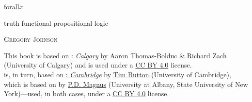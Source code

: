 

\pagestyle{empty}

\vspace*{80pt}

\begin{raggedleft}
\fontsize{34pt}{24pt}\sffamily
\selectfont
{forall\hspace{.08em}\fontsize{36pt}{24pt}\selectfont\rmfamily\textit{x}}

\smallskip\fontsize{16pt}{20pt}\sffamily\selectfont
\textcolor{maroon}{\uppercase{}}  

\bigskip\fontsize{16pt}{20pt}\selectfont

truth functional propositional logic

\vspace*{50pt}
\fontsize{10pt}{16pt}\selectfont
\textsc{Gregory Johnson}

\vfill
\textcolor{maroon}{\forallxversion}\par
\end{raggedleft}


\newpage 


\noindent \small This book is based on \href{http://forallx.openlogicproject.org/}{\forallx:\emph{ Calgary}} by {Aaron Thomas-Bolduc \& Richard Zach} ({University of Calgary}) and is used under a \href{https://creativecommons.org/licenses/by/4.0/}{CC BY 4.0} license.\\[1ex] 

 is, in turn, based on \href{http://people.ds.cam.ac.uk/tecb2/forallx.shtml}{\forallx:\emph{ Cambridge}} by \href{http://people.ds.cam.ac.uk/tecb2/index.shtml}{Tim Button} ({University of Cambridge}), 
which is based on \href{https://www.fecundity.com/logic/}{\forallx} by \href{https://www.fecundity.com/job/}{P.D. Magnus} (University at Albany, State University of New York)---used, in both cases, under a \href{https://creativecommons.org/licenses/by/4.0/}{CC BY 4.0} license.\\[1ex]


